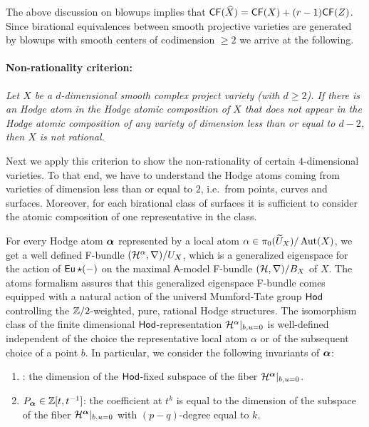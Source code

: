 \documentclass[twoside,leqno]{article}
\numberwithin{equation}{section}
\theoremstyle{plain}
\theoremstyle{definition}
\begin{document}
The above discussion on blowups implies that $\mathsf{CF}(\widehat{X}) = \mathsf{CF}(X) + (r-1) \mathsf{CF}(Z)$.
Since birational equivalences between smooth projective varieties are generated by blowups with smooth centers of codimension $\geq 2$ we arrive at the following.

\paragraph*{\bfseries Non-rationality criterion:}
    \emph{Let $X$ be a $d$-dimensional smooth complex project variety (with $d\ge 2$).
    If there is an Hodge atom in the Hodge atomic composition of $X$ that does not appear in the Hodge atomic composition of any variety of dimension less than or equal to $d-2$, then $X$ is not rational.}

\medskip

Next we apply this criterion to show the non-rationality of certain $4$-dimensional varieties.
To that end, we have to understand the Hodge atoms coming from varieties of dimension less than or equal to $2$, i.e.\ from points, curves and surfaces.
Moreover, for each birational class of surfaces it is sufficient to consider the atomic composition of one representative in the class.

For every Hodge atom $\boldsymbol{\alpha}$ represented by a local atom $\alpha \in \pi_{0}(\widetilde U_{X})/\operatorname{Aut}(X)$, we get a well defined F-bundle  $(\mathcal H^{\alpha},\nabla)/U_{X}$,  which is a generalized eigenspace for the action of $\operatorname{\mathsf{Eu}}\star (-)$ on the maximal $\mathsf{A}$-model F-bundle $(\mathcal H,\nabla)/B_{X}$ of $X$. The atoms formalism assures that this generalized eigenspace F-bundle comes equipped with a natural action of the universl Mumford-Tate group $\mathsf{Hod}$ controlling the $\mathbb Z/2$-weighted, pure, rational Hodge structures. The isomorphism class of the finite dimensional $\mathsf{Hod}$-representation $\mathcal H^{\alpha}|_{b,u=0}$ is well-defined independent of the choice the representative local atom $\alpha$ or of the subsequent choice of a point $b$.
In particular, we consider the following invariants of $\boldsymbol{\alpha}$:
\begin{enumerate}[wide]
\item {}: the dimension of the $\mathsf{Hod}$-fixed subspace of the fiber $\mathcal H^{\boldsymbol{\alpha}}|_{b,u=0}$.
\item {} $P_{\boldsymbol{\alpha}} \in \mathbb{Z}[t,t^{-1}]$: the coefficient at $t^k$ is equal to the dimension of the subspace of the fiber $\mathcal H^{\boldsymbol{\alpha}}|_{b,u=0}$ with $(p-q)$-degree equal to $k$.
\end{enumerate}
\end{document}

